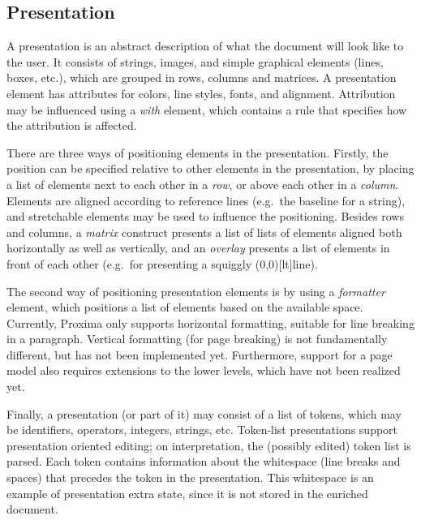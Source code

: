 \documentclass{speauth}
\begin{document}
%																
\subsection{Presentation} \label{sect:presLevel}

A presentation is an abstract description of what the document will look like to the user. It consists of strings, images, and simple graphical elements (lines, boxes, etc.), which are grouped in rows, columns and matrices. A presentation element has attributes for colors, line styles, fonts, and alignment. Attribution may be influenced using a {\em with} element, which contains a rule that specifies how the attribution is affected.

There are three ways of positioning elements in the presentation. Firstly, the position can be specified relative to other elements in the presentation, by placing a list of elements next to each other in a {\em row}, or above each other in a {\em column}. Elements are aligned according to reference lines (e.g.\ the baseline for a string), and stretchable elements may be used to influence the positioning. Besides rows and columns, a {\em matrix} construct presents a list of lists of elements aligned both horizontally as well as vertically, and an {\em overlay} presents a list of elements in front of each other (e.g.\ for presenting a squiggly \makebox(0,0)[lt]{}line). 

The second way of positioning presentation elements is by using a {\em formatter} element, which positions a list of elements based on the available space. Currently, Proxima only supports horizontal formatting, suitable for line breaking in a paragraph. Vertical formatting (for page breaking) is not fundamentally different, but has not been implemented yet. Furthermore, support for a page model also requires extensions to the lower levels, which have not been realized yet.

Finally, a presentation (or part of it) may consist of a list of tokens, which may be identifiers, operators, integers, strings, etc. Token-list presentations support presentation oriented editing; on interpretation, the (possibly edited) token list is parsed. Each token contains information about the whitespace (line breaks and spaces) that precedes the token in the presentation. This whitespace is an example of presentation extra state, since it is not stored in the enriched document. 
\end{document}
